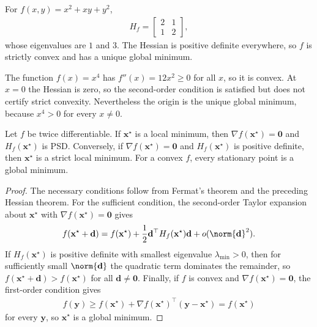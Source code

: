 \documentclass[a4paper, 12pt]{book}
\begin{document}
\begin{example}
    For $f(x,y)=x^2+xy+y^2$,
    \begin{align}
        H_f = \begin{bmatrix}2&1\\1&2\end{bmatrix},
    \end{align}
    whose eigenvalues are $1$ and $3$. The Hessian is positive definite everywhere,
    so $f$ is strictly convex and has a unique global minimum.
\end{example}

\begin{example}
    The function $f(x)=x^4$ has $f''(x)=12x^2\geq0$ for all $x$, so it is convex.
    At $x=0$ the Hessian is zero, so the second-order condition is satisfied but does
    not certify strict convexity. Nevertheless the origin is the unique global
    minimum, because $x^4>0$ for every $x\neq0$.
\end{example}

\begin{proposition}
    Let $f$ be twice differentiable. If $\mathbf{x}^\star$ is a local minimum, then
    $\nabla f(\mathbf{x}^\star)=\mathbf{0}$ and $H_f(\mathbf{x}^\star)$ is PSD.
    Conversely, if $\nabla f(\mathbf{x}^\star)=\mathbf{0}$ and
    $H_f(\mathbf{x}^\star)$ is positive definite, then $\mathbf{x}^\star$ is a strict
    local minimum. For a convex $f$, every stationary point is a global minimum.
\end{proposition}
\begin{proof}
    The necessary conditions follow from Fermat's theorem and the preceding Hessian
    theorem. For the sufficient condition, the second-order Taylor expansion about
    $\mathbf{x}^\star$ with $\nabla f(\mathbf{x}^\star)=\mathbf{0}$ gives
    \begin{align}
        f(\mathbf{x}^\star+\mathbf{d})
        = f(\mathbf{x}^\star)
        + \frac12\mathbf{d}^\top H_f(\mathbf{x}^\star)\mathbf{d}
        + o(\norm{\mathbf{d}}^2).
    \end{align}
    If $H_f(\mathbf{x}^\star)$ is positive definite with smallest eigenvalue
    $\lambda_{\min}>0$, then for sufficiently small $\norm{\mathbf{d}}$ the quadratic
    term dominates the remainder, so $f(\mathbf{x}^\star+\mathbf{d})>f(\mathbf{x}^\star)$
    for all $\mathbf{d}\neq\mathbf{0}$. Finally, if $f$ is convex and
    $\nabla f(\mathbf{x}^\star)=\mathbf{0}$, the first-order condition gives
    \begin{align}
        f(\mathbf{y}) \geq f(\mathbf{x}^\star)
        + \nabla f(\mathbf{x}^\star)^\top(\mathbf{y}-\mathbf{x}^\star)
        = f(\mathbf{x}^\star)
    \end{align}
    for every $\mathbf{y}$, so $\mathbf{x}^\star$ is a global minimum.
\end{proof}
\end{document}

